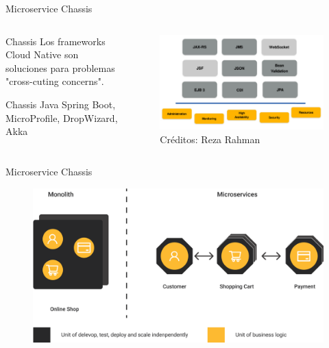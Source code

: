 \documentclass[aspectratio=169]{beamer}
\begin{document}
\begin{frame}{Microservice Chassis}



\begin{columns}[T] %
\begin{column}[T]{6cm} %
	\begin{block}{Chassis}
    Los frameworks Cloud Native son soluciones para problemas "cross-cuting concerns".
	\end{block}
    \begin{block}{Chassis Java}
Spring Boot, MicroProfile, DropWizard, Akka
	\end{block}
\end{column}
\begin{column}[T]{7cm} %
    \begin{figure}
    	\centering
    	\includegraphics[width=\linewidth]{Images/javaeemicropancake}
    	\caption{Créditos: Reza Rahman}
    \end{figure}

\end{column}
\end{columns}

\end{frame}

\begin{frame}{Microservice Chassis}
\begin{figure}
	\centering
	\includegraphics[width=0.7\linewidth]{Images/mp0}
\end{figure}
\end{frame}
\end{document}
